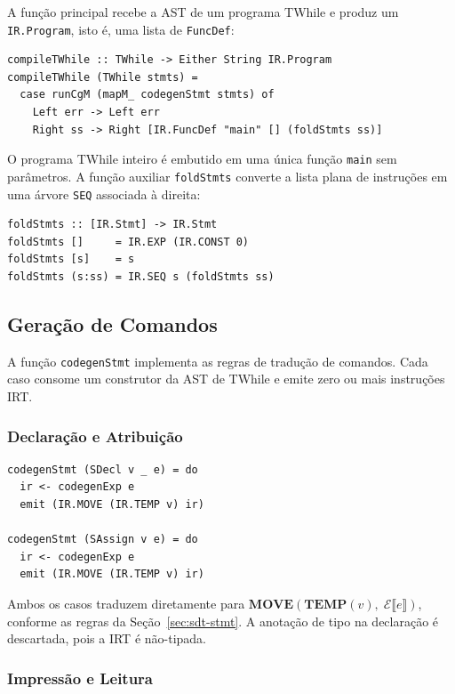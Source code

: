 A função principal recebe a AST de um programa TWhile e produz um
\texttt{IR.Program}, isto é, uma lista de \texttt{FuncDef}:

\begin{verbatim}
compileTWhile :: TWhile -> Either String IR.Program
compileTWhile (TWhile stmts) =
  case runCgM (mapM_ codegenStmt stmts) of
    Left err -> Left err
    Right ss -> Right [IR.FuncDef "main" [] (foldStmts ss)]
\end{verbatim}

O programa TWhile inteiro é embutido em uma única função \texttt{main} sem
parâmetros.  A função auxiliar \texttt{foldStmts} converte a lista plana de
instruções em uma árvore \texttt{SEQ} associada à direita:

\begin{verbatim}
foldStmts :: [IR.Stmt] -> IR.Stmt
foldStmts []     = IR.EXP (IR.CONST 0)
foldStmts [s]    = s
foldStmts (s:ss) = IR.SEQ s (foldStmts ss)
\end{verbatim}

\subsection{Geração de Comandos}\label{sec:ir-impl-stmts}

A função \texttt{codegenStmt} implementa as regras de tradução de comandos.
Cada caso consome um construtor da AST de TWhile e emite zero ou mais
instruções IRT.

\subsubsection*{Declaração e Atribuição}

\begin{verbatim}
codegenStmt (SDecl v _ e) = do
  ir <- codegenExp e
  emit (IR.MOVE (IR.TEMP v) ir)

codegenStmt (SAssign v e) = do
  ir <- codegenExp e
  emit (IR.MOVE (IR.TEMP v) ir)
\end{verbatim}

Ambos os casos traduzem diretamente para
$\mathbf{MOVE}(\mathbf{TEMP}(v),\; \mathcal{E}\llbracket e \rrbracket)$,
conforme as regras da Seção~\ref{sec:sdt-stmt}.  A anotação de tipo na
declaração é descartada, pois a IRT é não-tipada.

\subsubsection*{Impressão e Leitura}

